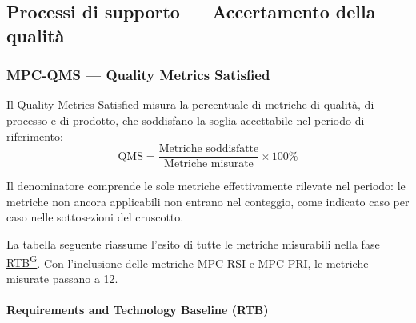 \documentclass[a4paper,12pt]{article}
\providecommand{\glslink}[2]{\href{https://alittlebyte-19.github.io/Documentazione/glossario.html\#gls-#1}{\underline{#2}\textsuperscript{\scriptsize G}}}
\begin{document}
\subsection{Processi di supporto — Accertamento della qualità}

\subsubsection{MPC-QMS — Quality Metrics Satisfied}

Il Quality Metrics Satisfied misura la percentuale di metriche di qualità, di processo e di prodotto, che soddisfano la soglia accettabile nel periodo di riferimento:
\[
  \text{QMS} = \frac{\text{Metriche soddisfatte}}{\text{Metriche misurate}} \times 100\%
\]

Il denominatore comprende le sole metriche effettivamente rilevate nel periodo: le metriche non ancora applicabili non entrano nel conteggio, come indicato caso per caso nelle sottosezioni del cruscotto.

La tabella seguente riassume l'esito di tutte le metriche misurabili nella fase \glslink{rtb-requirements-and-technology-baseline}{RTB}. Con l'inclusione delle metriche MPC-RSI e MPC-PRI, le metriche misurate passano a 12.

\paragraph*{Requirements and Technology Baseline (RTB)}
\end{document}
